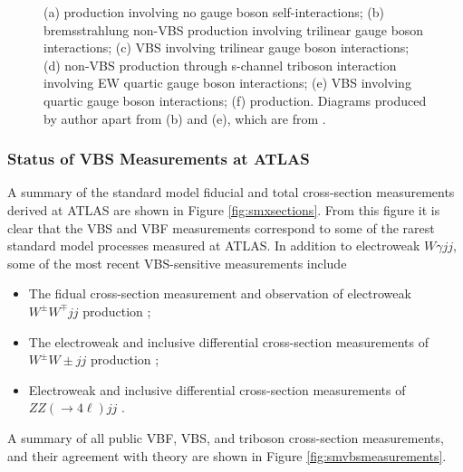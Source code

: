 \begin{figure}[t]
\begin{subfigure}[b]{0.32\textwidth}
    \caption{}
\end{subfigure}
\caption{(a) \ewwy production involving no gauge boson self-interactions; (b) bremsstrahlung \ewwy non-VBS production involving trilinear gauge boson interactions; (c) \ewwy VBS involving trilinear gauge boson interactions; (d) \ewwy non-VBS production through s-channel triboson interaction involving EW quartic gauge boson interactions; (e) \ewwy VBS involving quartic gauge boson interactions; (f) \qcdwy production. Diagrams produced by author apart from (b) and (e), which are from \cite{VBSWy:VBSWy}.\label{fig:vbswy:diagrams}}
\end{figure}

\subsubsection{Status of VBS Measurements at ATLAS}

A summary of the standard model fiducial and total cross-section measurements derived at ATLAS are shown in Figure \ref{fig:smxsections}. From this figure it is clear that the VBS and VBF measurements correspond to some of the rarest standard model processes measured at ATLAS. In addition to electroweak $W\gamma jj$, some of the most recent VBS-sensitive measurements include 
\begin{itemize}
    \item The fidual cross-section measurement and observation of electroweak $W^{\pm}W^{\mp}jj$ production \cite{Theory:opsignww};
    \item The electroweak and inclusive differential cross-section measurements of $W^{\pm}W{\pm}jj$ production \cite{Theory:samesignww};
    \item Electroweak and inclusive differential cross-section measurements of $ZZ(\rightarrow4\ell)jj$ \cite{Theory:zzfourl}.
\end{itemize}
A summary of all public VBF, VBS, and triboson cross-section measurements, and their agreement with theory are shown in Figure \ref{fig:smvbsmeasurements}.

